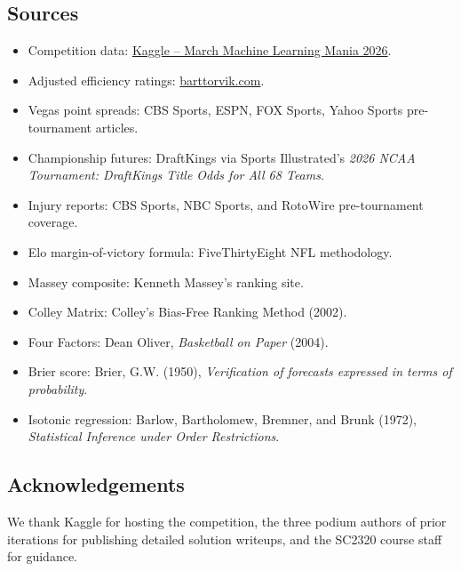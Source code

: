 \documentclass[11pt, a4paper]{article}
\begin{document}
\subsection*{Sources}
\begin{itemize}[leftmargin=*]
    \item Competition data: \href{https://www.kaggle.com/competitions/march-machine-learning-mania-2026/data}{Kaggle -- March Machine Learning Mania 2026}.
    \item Adjusted efficiency ratings: \href{http://barttorvik.com/}{barttorvik.com}.
    \item Vegas point spreads: CBS Sports, ESPN, FOX Sports, Yahoo Sports pre-tournament articles.
    \item Championship futures: DraftKings via Sports Illustrated's \emph{2026 NCAA Tournament: DraftKings Title Odds for All 68 Teams}.
    \item Injury reports: CBS Sports, NBC Sports, and RotoWire pre-tournament coverage.
    \item Elo margin-of-victory formula: FiveThirtyEight NFL methodology.
    \item Massey composite: Kenneth Massey's ranking site.
    \item Colley Matrix: Colley's Bias-Free Ranking Method (2002).
    \item Four Factors: Dean Oliver, \emph{Basketball on Paper} (2004).
    \item Brier score: Brier, G.W. (1950), \emph{Verification of forecasts expressed in terms of probability}.
    \item Isotonic regression: Barlow, Bartholomew, Bremner, and Brunk (1972), \emph{Statistical Inference under Order Restrictions}.
\end{itemize}

\subsection*{Acknowledgements}
We thank Kaggle for hosting the competition, the three podium authors of prior iterations for publishing detailed solution writeups, and the SC2320 course staff for guidance.
\end{document}
